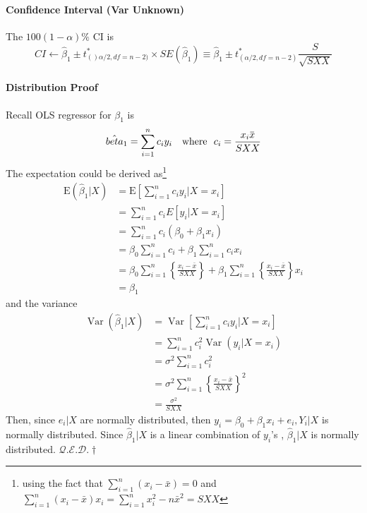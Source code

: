 \documentclass[11pt]{article}
\newcommand{\qed}{\hfill $\mathcal{Q}.\mathcal{E}.\mathcal{D}.\dagger$}
\newcommand{\overbar}[1]{\mkern 1.5mu\overline{\mkern-1.5mu#1\mkern-1.5mu}\mkern 1.5mu}
\begin{document}
\paragraph{Confidence Interval (Var Unknown)}
The $100(1- \alpha)\%$ CI is
\begin{equation*}
    CI \gets \hat{\beta}_1 \pm t^\ast_{()\alpha/2, df=n-2)} \times SE(\hat{\beta}_1) \equiv \hat{\beta}_1 \pm t^\ast_{(\alpha/2, df=n-2)} \frac{S}{\sqrt{S X X}}
\end{equation*}
\paragraph{Distribution Proof}
Recall OLS regressor for $\beta_1$ is
\begin{equation*}
    \hat{beta}_1 = \sum_{i = 1}^n c_iy_i \quad \text{where}~~ c_i = \frac{x_i \overbar{x}}{SXX}
\end{equation*}
The expectation could be derived as\footnote{using the fact that $\sum_{i=1}^{n}\left(x_{i}-\bar{x}\right)=0$ and $\sum_{i=1}^{n}\left(x_{i}-\bar{x}\right) x_{i}=\sum_{i=1}^{n} x_{i}^{2}-n \bar{x}^{2}=S X X$}
\begin{align*}
    \mathrm{E}\left(\hat{\beta}_{1} | X\right) &=\mathrm{E}\left[\sum_{i=1}^{n} c_{i} y_{i} | X=x_{i}\right] \\ &=\sum_{i=1}^{n} c_{i} E\left[y_{i} | X=x_{i}\right] \\ &=\sum_{i=1}^{n} c_{i}\left(\beta_{0}+\beta_{1} x_{i}\right) \\ &=\beta_{0} \sum_{i=1}^{n} c_{i}+\beta_{1} \sum_{i=1}^{n} c_{i} x_{i} \\ &=\beta_{0} \sum_{i=1}^{n}\left\{\frac{x_{i}-\bar{x}}{S X X}\right\}+\beta_{1} \sum_{i=1}^{n}\left\{\frac{x_{i}-\bar{x}}{S X X}\right\} x_{i} \\ &=\beta_{1} 
\end{align*}
and the variance
\begin{align*}
    \operatorname{Var}\left(\hat{\beta}_{1} | X\right) &=\operatorname{Var}\left[\sum_{i=1}^{n} c_{i} y_{i} | X=x_{i}\right] \\ &=\sum_{i=1}^{n} c_{i}^{2} \operatorname{Var}\left(y_{i} | X=x_{i}\right) \\ &=\sigma^{2} \sum_{i=1}^{n} c_{i}^{2} \\ &=\sigma^{2} \sum_{i=1}^{n}\left\{\frac{x_{i}-\bar{x}}{S X X}\right\}^{2} \\ &=\frac{\sigma^{2}}{S X X}
\end{align*}
Then, since $e_i |X$ are normally distributed, then $y_i = \beta_{0}+\beta_{1} x_{i}+e_{i}, Y_{i} | X$ is normally distributed. Since $\hat{\beta}_{1} | X$ is a linear combination of $y_i$'s , $\hat{\beta}_1 | X$ is normally distributed. \qed
\end{document}
